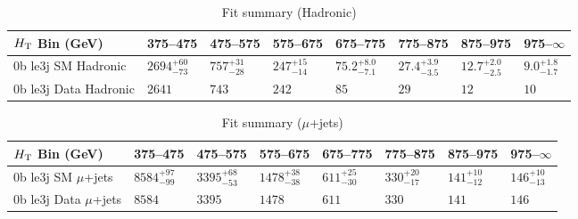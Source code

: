 \documentclass[8pt]{article}
\def\scalht{\mbox{$H_{\rm{T}}$}\xspace}
\newcommand\T{\rule{0pt}{2.6ex}}
\begin{document}
\begin{table}[ht!]
\caption{Fit summary (Hadronic)}
\label{tab:ensemble-summary}
\centering
\begin{tabular}{ llllllll }

\hline
\scalht Bin (GeV)       & 375--475                       & 475--575                       & 575--675                       & 675--775                       & 775--875                       & 875--975                       & 975--$\infty$                  \\ [1.000000ex]
\hline
0b le3j SM Hadronic\T   & $2694^{+60}_{-73}$             & $757^{+31}_{-28}$              & $247^{+15}_{-14}$              & $75.2^{+8.0}_{-7.1}$           & $27.4^{+3.9}_{-3.5}$           & $12.7^{+2.0}_{-2.5}$           & $9.0^{+1.8}_{-1.7}$            \\ 
0b le3j Data Hadronic\T & $2641$                         & $743$                          & $242$                          & $85$                           & $29$                           & $12$                           & $10$                           \\ 
\hline

\end{tabular}
\end{table}
\begin{table}[ht!]
\caption{Fit summary ($\mu$+jets)}
\label{tab:ensemble-summary}
\centering
\begin{tabular}{ llllllll }

\hline
\scalht Bin (GeV)       & 375--475                       & 475--575                       & 575--675                       & 675--775                       & 775--875                       & 875--975                       & 975--$\infty$                  \\ [1.000000ex]
\hline
0b le3j SM $\mu$+jets\T & $8584^{+97}_{-99}$             & $3395^{+68}_{-53}$             & $1478^{+38}_{-38}$             & $611^{+25}_{-30}$              & $330^{+20}_{-17}$              & $141^{+10}_{-12}$              & $146^{+10}_{-13}$              \\ 
0b le3j Data $\mu$+jets\T & $8584$                         & $3395$                         & $1478$                         & $611$                          & $330$                          & $141$                          & $146$                          \\ 
\hline

\end{tabular}
\end{table}
\end{document}
